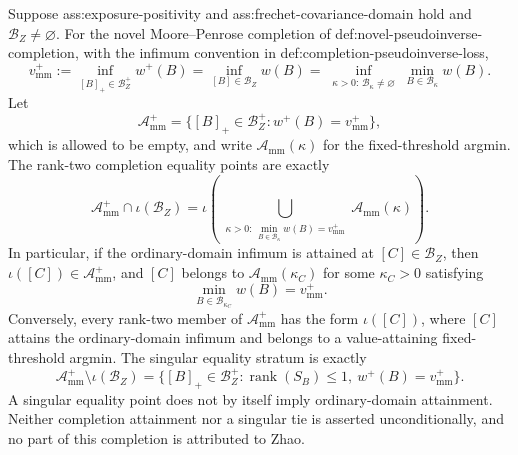 Suppose ass:exposure-positivity and ass:frechet-covariance-domain hold and \(\mathcal B_Z\ne\varnothing\).  For the novel Moore--Penrose completion of def:novel-pseudoinverse-completion, with the infimum convention in def:completion-pseudoinverse-loss,
\[
v_{\mathrm{mm}}^+
:=\inf_{[B]_+\in\mathcal B_Z^+}w^+(B)
=\inf_{[B]\in\mathcal B_Z}w(B)
=\inf_{\substack{\kappa>0:\,\mathcal B_\kappa\ne\varnothing}}
\min_{B\in\mathcal B_\kappa}w(B).
\]
Let
\[
\mathcal A_{\mathrm{mm}}^+
=\{[B]_+\in\mathcal B_Z^+:w^+(B)=v_{\mathrm{mm}}^+\},
\]
which is allowed to be empty, and write \(\mathcal A_{\mathrm{mm}}(\kappa)\) for the fixed-threshold argmin.  The rank-two completion equality points are exactly
\[
\mathcal A_{\mathrm{mm}}^+\cap\iota(\mathcal B_Z)
=\iota\!\left(
\bigcup_{\substack{\kappa>0:\,
\min_{B\in\mathcal B_\kappa}w(B)=v_{\mathrm{mm}}^+}}
\mathcal A_{\mathrm{mm}}(\kappa)\right).
\]
In particular, if the ordinary-domain infimum is attained at \([C]\in\mathcal B_Z\), then \(\iota([C])\in\mathcal A_{\mathrm{mm}}^+\), and \([C]\) belongs to \(\mathcal A_{\mathrm{mm}}(\kappa_C)\) for some \(\kappa_C>0\) satisfying
\[
\min_{B\in\mathcal B_{\kappa_C}}w(B)=v_{\mathrm{mm}}^+.
\]
Conversely, every rank-two member of \(\mathcal A_{\mathrm{mm}}^+\) has the form \(\iota([C])\), where \([C]\) attains the ordinary-domain infimum and belongs to a value-attaining fixed-threshold argmin.  The singular equality stratum is exactly
\[
\mathcal A_{\mathrm{mm}}^+\setminus\iota(\mathcal B_Z)
=\{[B]_+\in\mathcal B_Z^+:\operatorname{rank}(S_B)\le1,\ w^+(B)=v_{\mathrm{mm}}^+\}.
\]
A singular equality point does not by itself imply ordinary-domain attainment.  Neither completion attainment nor a singular tie is asserted unconditionally, and no part of this completion is attributed to Zhao.